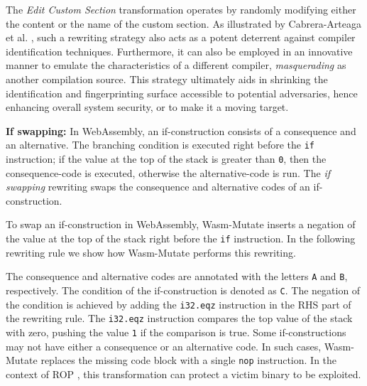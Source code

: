 \documentclass[sigplan,screen]{acmart}
\newcommand{\tool}{{\sc Wasm-Mutate}\xspace}
\begin{document}


The \emph{Edit Custom Section} transformation operates by randomly modifying either the content or the name of the custom section. 
As illustrated by Cabrera-Arteaga et al. \cite{CABRERAARTEAGA2023103296}, such a rewriting strategy also acts as a potent deterrent against compiler identification techniques.
Furthermore, it can also be employed in an innovative manner to emulate the characteristics of a different compiler, \emph{masquerading} as another compilation source. 
This strategy ultimately aids in shrinking the identification and fingerprinting surface accessible to potential adversaries, hence enhancing overall system security, or to make it a moving target.



\textbf{If swapping:} In WebAssembly, an if-construction consists of a consequence and an alternative. The branching condition is executed right before the \texttt{if} instruction; if the value at the top of the stack is greater than \texttt{0}, then the consequence-code is executed, otherwise the alternative-code is run.
The \emph{if swapping} rewriting swaps the consequence and alternative codes of an if-construction.


To swap an if-construction in WebAssembly, \tool inserts a negation of the value at the top of the stack right before the \texttt{if} instruction.
In the following rewriting rule we show how \tool performs this rewriting.

The consequence and alternative codes are annotated with the letters \texttt{A} and \texttt{B}, respectively.
The condition of the if-construction is denoted as \texttt{C}.
The negation of the condition is achieved by adding the \texttt{i32.eqz} instruction in the RHS part of the rewriting rule.
The \texttt{i32.eqz} instruction compares the top value of the stack with zero, pushing the value \texttt{1} if the comparison is true.
Some if-constructions may not have either a consequence or an alternative code.
In such cases, \tool replaces the missing code block with a single \texttt{nop} instruction.
In the context of ROP \cite{Swivel}, this transformation can protect a victim binary to be exploited. 
\end{document}
